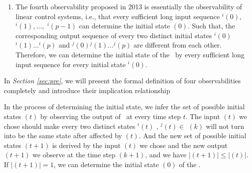 \begin{enumerate}
	\item  The fourth observability proposed in 2013 \cite{Fornasini2013Observability} is essentially the observability of linear control systems, i.e., that every sufficient long input sequence \Input$^{i}(0),$ \Input$^{i}(1),\ldots,$ \Input$^{i}(p-1)$ can determine the initial state \State$(0)$. Such that, the corresponding output sequence of every two distinct initial states \Output$^{i}(0)$\Output$^{i}(1)\ldots$\Output$^{i}(p)$ and \Output$^{j}(0)$\Output$^{j}(1)\ldots$\Output$^{j}(p)$ are different from each other. Therefore, we can determine the initial state of the \BCN\ by every sufficient long input sequence for every initial state \State$^{i}(0)$.
\end{enumerate}
 


In {\em Section \ref{sec:pre}}, we will present the formal definition of four observabilities completely and introduce their implication relationship%
\begin{comment}
\ly{In the four existing observability, we can not determine the initail state of \BCNs\ by the first and second observability.} Although we can determine the initail state of \BCNs\ by the third and fourth observability, the requirements for \BCNs\ to determine the initail state are difficult to meet. Thus, we consider that whether we can determine the initial state of some \BCNs\ which can not be determined by the third and fourth observability.
\end{comment}

In the process of determining the initial state, we infer the set of possible initial states \Ustate$(t)$ by observing the output of \BCN\ at every time step $t$. The input \Input$(t)$ we chose should make every two distinct states \State$^{i}(t)$ , \State$^{j}(t)$$\in$ \Ustate$(k)$ will not turn into be the same state after affected by \Input$(t)$. And the new set of possible initial states \Ustate$(t+1)$ is derived by the input \Input$(t)$ we chose and the new output \Output$(t+1)$ we observe at the time step $(k+1)$, and we have $|$\Ustate$(t+1)$$|\le|$\Ustate$(t)$$|$. If $|$\Ustate$(t+1)$$|=1$, we can determine the initial state \State$(0)$ of the \BCN.

